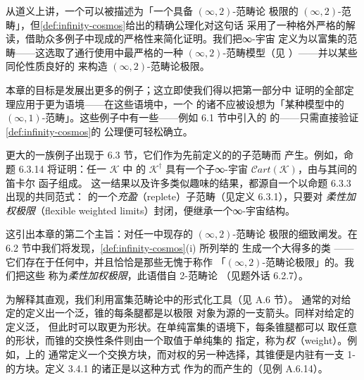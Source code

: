 从道义上讲，一个\trInfinityCosmos{}可以被描述为「一个具备 $(\infty,2)$-范畴论
极限的 $(\infty,2)$-范畴」，但\cref{def:infinity-cosmos}给出的精确公理化对这句话
采用了一种格外严格的解读，借助众多例子中现成的严格性来简化证明。我们把∞-宇宙
定义为以\trQuasiCategory{}富集的范畴——这选取了通行使用中最严格的一种
$(\infty,2)$-范畴模型（见 \cite[0.0.3-4]{bib79}）——并以某些同伦性质良好的%
\trSimpliciallyEnrichedLimit{}来构造 $(\infty,2)$-范畴论极限。

本章的目标是发展出更多的\trInfinityCosmos{}例子；这立即使我们得以把第一部分中
证明的全部定理应用于更为\trExotic{}语境——在这些语境中，一个%
\trInfinityCosmos{}的诸\trInfinityCategory{}不应被设想为「某种模型中的
$(\infty,1)$-范畴」。这些例子中有一些——例如 6.1 节中引入的%
\trIsofibration{}的\trInfinityCosmos——只需直接验证\cref{def:infinity-cosmos}的
公理便可轻松确立。

更大的一族例子出现于 6.3 节，它们作为先前定义的\trInfinityCosmos{}的子范畴而
产生。例如，命题 6.3.14 将证明：任一\trInfinityCosmos{} $\mathcal{K}$ 中%
\trIsofibration{}的\trInfinityCosmos{} $\mathcal{K}^{\dagger}$ 具有一个子∞-宇宙
$\mathcal{C}\mathit{art}(\mathcal{K})$，由\trCartesianFibration{}与其间的笛卡尔
函子组成。
这一结果以及许多类似趣味的结果，都源自一个以命题 6.3.3 出现的共同范式：%
\trInfinityCosmos{}的一个\emph{充盈}（replete）子范畴（见定义 6.3.1），只要对%
\emph{柔性加权极限}（flexible weighted limits）封闭，便继承一个∞-宇宙结构。

这引出本章的第二个主旨：对任一\trInfinityCosmos{}中现存的 $(\infty,2)$-范畴论
极限的细致阐发。在 6.2 节中我们将发现，\cref{def:infinity-cosmos}(i) 所列举的%
\trCosmologicalLimitNotions{}生成一个大得多的\trSimpliciallyEnrichedLimit{}类
——它们存在于任何\trInfinityCosmos{}中，并且恰恰是那些无愧于称作
「$(\infty,2)$-范畴论极限」的\trSimpliciallyEnrichedLimit。我们把这些%
\trSimpliciallyEnrichedLimit{}称为\emph{柔性加权极限}，此语借自 2-范畴论
（见题外话 6.2.7）。

为解释其直观，我们利用富集范畴论中\trWeightedLimit{}的形式化工具（见 A.6 节）。
通常的\trLimit{}对给定的\trDiagram{}定义出一个泛\trCone，锥的每条腿都是以极限
对象为源的一支箭头。\trWeightedLimit{}同样对给定的\trDiagram{}定义泛\trCone，
但此时\trCone{}可以取更为\trExotic{}形状。在单纯富集的语境下，每条锥腿都可以
取任意\trSimplicialSet{}的形状，而锥的交换性条件则由一个取值于单纯集的%
\trSimplicialFunctor{}指定，称为\emph{权}（weight）。例如，\trCospan{}上的
通常\trCone{}定义一个交换方块，而对权的另一种选择，其锥便是内驻有一支
1-\trSimplex{}的方块。定义 3.4.1 的诸\trCommaInfinityCategory{}正是以这种方式
作为\trCospan{}的\trWeightedLimit{}而产生的（见例 A.6.14）。

